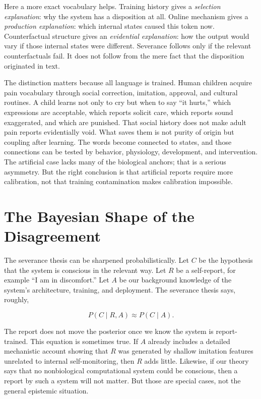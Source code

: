 \documentclass[11pt]{article}
\begin{document}
Here a more exact vocabulary helps. Training history gives a \textit{selection explanation}: why the system has a disposition at all. Online mechanism gives a \textit{production explanation}: which internal states caused this token now. Counterfactual structure gives an \textit{evidential explanation}: how the output would vary if those internal states were different. Severance follows only if the relevant counterfactuals fail. It does not follow from the mere fact that the disposition originated in text.

The distinction matters because all language is trained. Human children acquire pain vocabulary through social correction, imitation, approval, and cultural routines. A child learns not only to cry but when to say ``it hurts,'' which expressions are acceptable, which reports solicit care, which reports sound exaggerated, and which are punished. That social history does not make adult pain reports evidentially void. What saves them is not purity of origin but coupling after learning. The words become connected to states, and those connections can be tested by behavior, physiology, development, and intervention. The artificial case lacks many of the biological anchors; that is a serious asymmetry. But the right conclusion is that artificial reports require more calibration, not that training contamination makes calibration impossible.

\section{The Bayesian Shape of the Disagreement}

The severance thesis can be sharpened probabilistically. Let $C$ be the hypothesis that the system is conscious in the relevant way. Let $R$ be a self-report, for example ``I am in discomfort.'' Let $A$ be our background knowledge of the system's architecture, training, and deployment. The severance thesis says, roughly,

\[
P(C \mid R, A) \approx P(C \mid A).
\]

The report does not move the posterior once we know the system is report-trained. This equation is sometimes true. If $A$ already includes a detailed mechanistic account showing that $R$ was generated by shallow imitation features unrelated to internal self-monitoring, then $R$ adds little. Likewise, if our theory says that no nonbiological computational system could be conscious, then a report by such a system will not matter. But those are special cases, not the general epistemic situation.
\end{document}
